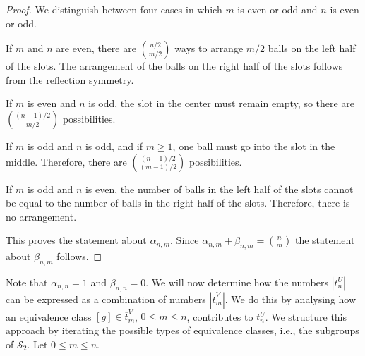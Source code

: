 \documentclass[a4paper]{article}
\begin{document}
\begin{proof}
We distinguish between four cases in which $m$ is even or odd and $n$ is even or odd.

If $m$ and $n$ are even, there are $\binom{n/2}{m/2}$ ways to
arrange $m/2$ balls on the left half of the slots.
The arrangement of the balls on the right half of the slots follows from the reflection symmetry.

If $m$ is even and $n$ is odd, the slot in the center must remain empty,
so there are $\binom{(n-1)/2}{m/2}$ possibilities.

If $m$ is odd and $n$ is odd, and if $m \ge 1$, one ball must go into the slot in the middle.
Therefore, there are $\binom{(n-1)/2}{(m-1)/2}$ possibilities.

If $m$ is odd and $n$ is even, the number of balls in the left half of the slots cannot be equal
to the number of balls in the right half of the slots.
Therefore, there is no arrangement.

This proves the statement about $\alpha_{n,m}$.
Since $\alpha_{n,m} + \beta_{n,m} = \binom{n}{m}$ the statement about $\beta_{n,m}$ follows.
\end{proof}
Note that $\alpha_{n,n} = 1$ and $\beta_{n,n} = 0$.
We will now determine how the numbers $|t^U_n|$ can be expressed as a combination of
numbers $|\overline{t}^{V}_m|$.
We do this by analysing how an equivalence class $[g] \in \overline{t}^{V}_m$, $0 \le m \le n$, contributes
to $t^U_n$.
We structure this approach by iterating the possible types of equivalence classes, i.e., the subgroups of $\mathcal{S}_2$.
Let $0 \le m \le n$.
\end{document}
